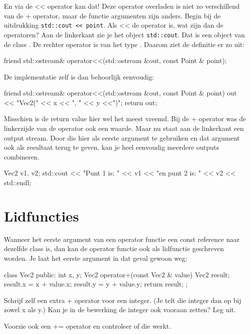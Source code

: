\documentclass[11pt, oldfontcommands, oneside, a4paper]{memoir}
\begin{document}
En via de << operator kan dat! Deze operator overladen is niet zo verschillend van de + operator, maar de functie argumenten zijn anders. Begin bij de uitdrukking \texttt{std::cout << point}. Als << de operator is, wat zijn dan de operatoren? Aan de linkerkant zie je het object \texttt{std::cout}. Dat is een object van de class . De rechter operator is van het type . Daarom ziet de definitie er zo uit:

\begin{code}
friend std::ostream& operator<<(std::ostream &out, const Point & point);
\end{code}

De implementatie zelf is dan behoorlijk eenvoudig:

\begin{code}
friend std::ostream& operator<<(std::ostream &out, const Point & point) {
  out << "Vec2(" << x << ", " << y <<")";
  return out;
}
\end{code}

Misschien is de return value hier wel het meest vreemd. Bij de + operator was de linkerzijde van de operator ook een waarde. Maar nu staat aan de linkerkant een output stream. Door die hier als eerste argument te gebruiken en dat argument ook als resultaat terug te geven, kan je heel eenvoudig meerdere outputs combineren.

\begin{code}
Vec2 v1, v2;
std::cout << "Punt 1 is: " << v1 << "en punt 2 is: " << v2 << std::endl;
\end{code} 

\section{Lidfuncties}
Wanneer het eerste argument van een operator functie een const reference naar dezelfde class is, dan kan de operator functie ook als lidfunctie geschreven worden. Je laat het eerste argument in dat geval gewoon weg:

\begin{code}
class Vec2 {
public:
  int x, y;
  Vec2 operator+(const Vec2 & value) {
    Vec2 result;
    result.x = x + value.x; 
    result.y = y + value.y;
    return result;
  }
};
\end{code}

\begin{exercise}
Schrijf zelf een extra + operator voor een integer. (Je telt die integer dan op bij zowel x als y.) Kan je in de bewerking de integer ook vooraan zetten? Leg uit.

Voorzie ook een += operator en controleer of die werkt.
\end{exercise}
\end{document}
